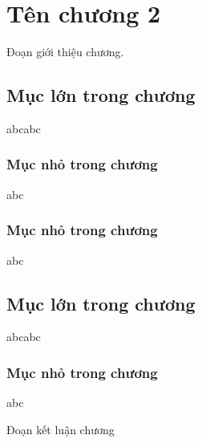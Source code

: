\clearpage
{}

\setcounter{chapter}{1}
\chapter[{Tên chương 2}]{Tên chương 2}

Đoạn giới thiệu chương.

\section{Mục lớn trong chương}

abcabc

\subsection{Mục nhỏ trong chương}

abc

\subsection{Mục nhỏ trong chương}

abc

\section{Mục lớn trong chương}

abcabc

\subsection{Mục nhỏ trong chương}

abc


\vspace{0.5cm}

Đoạn kết luận chương